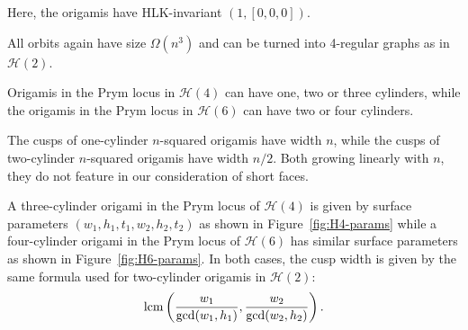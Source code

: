 \documentclass[a4paper,11pt]{amsart}
\numberwithin{equation}{section}
\numberwithin{figure}{section}
\numberwithin{table}{section}
\newcommand{\calH}{\mathcal{H}}
\newcommand{\cuspwidth}{{\rm{lcm}}\left(\frac{w_{1}}{\gcd(w_{1},h_{1})},\frac{w_{2}}{\gcd(w_{2},h_{2})}\right)}
\begin{document}
Here, the origamis have HLK-invariant $(1,[0,0,0])$.

All orbits again have size $\Omega(n^{3})$ and can be turned into 4-regular graphs as in $\calH(2)$.

Origamis in the Prym locus in $\calH(4)$ can have one, two or three cylinders, while the origamis in the Prym locus in $\calH(6)$ can have two or four cylinders.

The cusps of one-cylinder $n$-squared origamis have width $n$, while the cusps of two-cylinder $n$-squared origamis have width $n/2$. Both growing linearly with $n$, they do not feature in our consideration of short faces.

A three-cylinder origami in the Prym locus of $\calH(4)$ is given by surface parameters $(w_1,h_1,t_1,w_2,h_2,t_2)$ as shown in Figure~\ref{fig:H4-params} while a four-cylinder origami in the Prym locus of $\calH(6)$ has similar surface parameters as shown in Figure~\ref{fig:H6-params}. In both cases, the cusp width is given by the same formula used for two-cylinder origamis in $\calH(2)$:
\[\cuspwidth.\]
\end{document}
